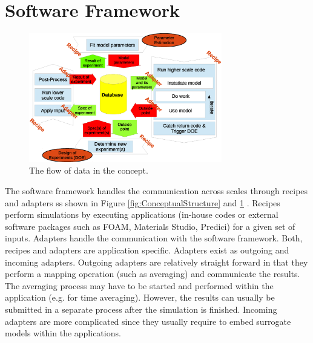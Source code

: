 \section{Software Framework}
%

\begin{figure}
  \centering
  \includegraphics[width=0.75\textwidth,keepaspectratio=true]{./Content/Figures/Data_Flow.eps}
  \caption{The flow of data in the {\MoDeNa} concept.
  }
  \label{fig:DataFlow}
\end{figure}

The {\MoDeNa} software framework handles the communication across scales through
recipes and adapters ss shown in Figure \ref{fig:ConceptualStructure} and
\ref{fig:DataFlow} . Recipes perform simulations by executing applications
(in-house codes or external software packages such as FOAM, Materials Studio,
Predici) for a given set of inputs.  Adapters handle the communication with the
{\MoDeNa} software framework.  Both, recipes and adapters are application
specific.  Adapters exist as outgoing and incoming adapters.  Outgoing adapters
are relatively straight forward in that they perform a mapping operation (such
as averaging) and communicate the results. The averaging process may have to be
started and performed within the application (e.g.  for time averaging).
However, the results can usually be submitted in a separate process after the
simulation is finished. Incoming adapters are more complicated since they
usually require to embed surrogate models within the applications.

